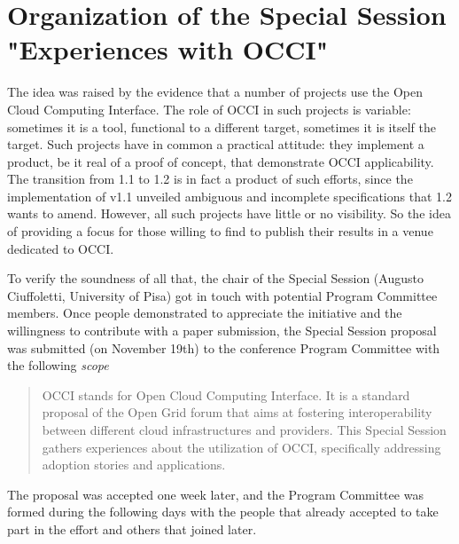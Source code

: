 \documentclass[10pt,a4paper]{article}
\begin{document}
\section{Organization of the Special Session "Experiences with OCCI"}

The idea was raised by the evidence that a number of projects use the Open Cloud Computing Interface. The role of OCCI in such projects is variable: sometimes it is a tool, functional to a different target, sometimes it is itself the target. Such projects have in common a practical attitude: they implement a product, be it real of a proof of concept, that demonstrate OCCI applicability. The transition from 1.1 to 1.2 is in fact a product of such efforts, since the implementation of v1.1 unveiled ambiguous and incomplete specifications that 1.2 wants to amend. However, all such projects have little or no visibility. So the idea of providing a focus for those willing to find to publish their results in a venue dedicated to OCCI.

To verify the soundness of all that, the chair of the Special Session (Augusto Ciuffoletti, University of Pisa) got in touch with potential Program Committee members. Once people demonstrated to appreciate the initiative and the willingness to contribute with a paper submission, the Special Session proposal was submitted (on November 19th) to the conference Program Committee with the following {\em scope}

\begin{quote}
	OCCI stands for Open Cloud Computing Interface. It is a standard proposal of the Open Grid forum that aims at fostering interoperability between different cloud infrastructures and providers. This Special Session gathers experiences about the utilization of OCCI, specifically addressing adoption stories and applications.
\end{quote}

The proposal was accepted one week later, and the Program Committee was formed during the following days with the people that already accepted to take part in the effort and others that joined later.
\end{document}
